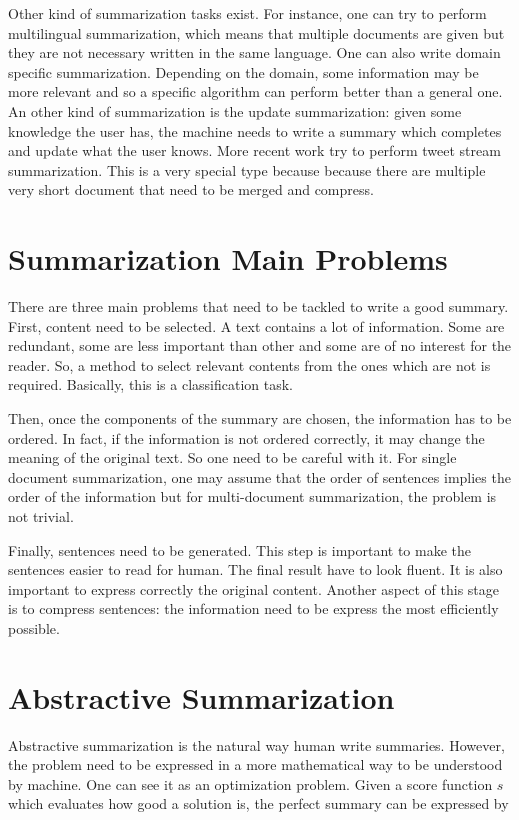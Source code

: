\documentclass[11pt,a4paper,oldfontcommands]{memoir}
\begin{document}
Other kind of summarization tasks exist. For instance, one can try to perform multilingual summarization, which means that multiple documents are given but they are not necessary written in the same language. One can also write domain specific summarization. Depending on the domain, some information may be more relevant and so a specific algorithm can perform better than a general one. An other kind of summarization is the update summarization: given some knowledge the user has, the machine needs to write a summary which completes and update what the user knows. More recent work try to perform tweet stream summarization. This is a very special type because because there are multiple very short document that need to be merged and compress.

\section{Summarization Main Problems}
\label{Summarization Main Problems}

There are three main problems that need to be tackled to write a good summary.
First, content need to be selected. A text contains a lot of information. Some are redundant, some are less important than other and some are of no interest for the reader. So, a method to select relevant contents from the ones which are not is required. Basically, this is a classification task.

Then, once the components of the summary are chosen, the information has to be ordered. In fact, if the information is not ordered correctly, it may change the meaning of the original text. So one need to be careful with it. For single document summarization, one may assume that the order of sentences implies the order of the information but for multi-document summarization, the problem is not trivial.

Finally, sentences need to be generated. This step is important to make the sentences easier to read for human. The final result have to look fluent. It is also important to express correctly the original content. Another aspect of this stage is to compress sentences: the information need to be express the most efficiently possible.

\section{Abstractive Summarization}

Abstractive summarization is the natural way human write summaries. However, the problem need to be expressed in a more mathematical way to be understood by machine. One can see it as an optimization problem. Given a score function $s$ which evaluates how good a solution is, the perfect summary can be expressed by
\end{document}
